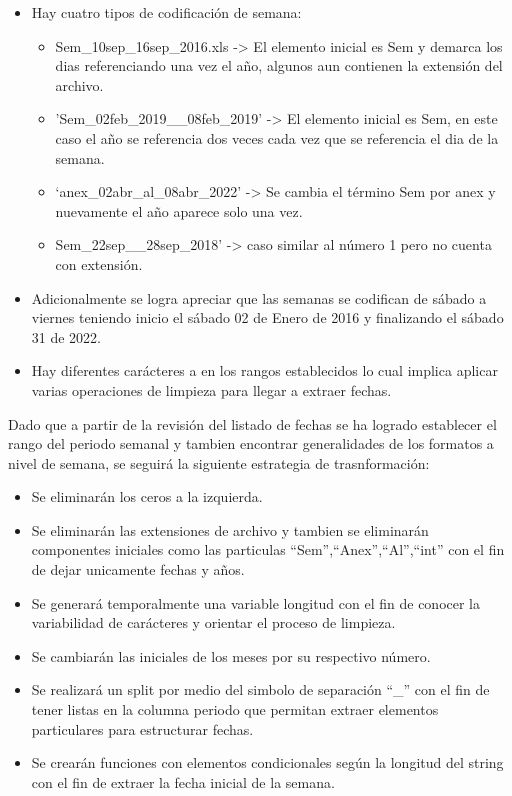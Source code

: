 \documentclass[
]{book}
\providecommand{\tightlist}{%
  \setlength{\itemsep}{0pt}\setlength{\parskip}{0pt}}
\begin{document}
\begin{itemize}
\item
  Hay cuatro tipos de codificación de semana:

  \begin{itemize}
  \tightlist
  \item
    Sem\_10sep\_16sep\_2016.xls -\textgreater{} El elemento inicial es Sem y demarca los dias referenciando una vez el año, algunos aun contienen la extensión del archivo.
  \item
    'Sem\_02feb\_2019\_\_08feb\_2019' -\textgreater{} El elemento inicial es Sem, en este caso el año se referencia dos veces cada vez que se referencia el dia de la semana.
  \item
    `anex\_02abr\_al\_08abr\_2022' -\textgreater{} Se cambia el término Sem por anex y nuevamente el año aparece solo una vez.
  \item
    Sem\_22sep\_\_28sep\_2018' -\textgreater{} caso similar al número 1 pero no cuenta con extensión.
  \end{itemize}
\item
  Adicionalmente se logra apreciar que las semanas se codifican de sábado a viernes teniendo inicio el sábado 02 de Enero de 2016 y finalizando el sábado 31 de 2022.
\item
  Hay diferentes carácteres a en los rangos establecidos lo cual implica aplicar varias operaciones de limpieza para llegar a extraer fechas.
\end{itemize}

Dado que a partir de la revisión del listado de fechas se ha logrado establecer el rango del periodo semanal y tambien encontrar generalidades de los formatos a nivel de semana, se seguirá la siguiente estrategia de trasnformación:

\begin{itemize}
\tightlist
\item
  Se eliminarán los ceros a la izquierda.\\
\item
  Se eliminarán las extensiones de archivo y tambien se eliminarán componentes iniciales como las particulas ``Sem'',``Anex'',``Al'',``int'' con el fin de dejar unicamente fechas y años.
\item
  Se generará temporalmente una variable longitud con el fin de conocer la variabilidad de carácteres y orientar el proceso de limpieza.
\item
  Se cambiarán las iniciales de los meses por su respectivo número.
\item
  Se realizará un split por medio del simbolo de separación ``\_'' con el fin de tener listas en la columna periodo que permitan extraer elementos particulares para estructurar fechas.
\item
  Se crearán funciones con elementos condicionales según la longitud del string con el fin de extraer la fecha inicial de la semana.
\end{itemize}
\end{document}
